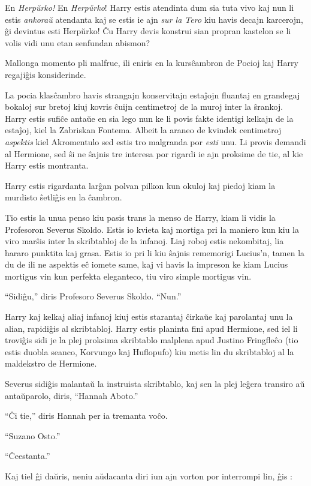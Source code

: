 En \emph{Herpŭrko!} En \emph{Herpŭrko}! Harry estis atendinta dum sia
tuta vivo kaj nun li estis \emph{ankoraŭ} atendanta kaj se estis ie
ajn \emph{sur la Tero} kiu havis decajn karcerojn, ĝi devintus esti
Herpŭrko! Ĉu Harry devis konstrui sian propran kastelon se li volis
vidi unu etan senfundan abismon?

Mallonga momento pli malfrue, ili eniris en la kursĉambron de Pocioj
kaj Harry regajiĝis konsiderinde.

La pocia klasĉambro havis strangajn konservitajn estaĵojn fluantaj en
grandegaj bokaloj sur bretoj kiuj kovris ĉuijn centimetroj de la muroj
inter la ŝrankoj. Harry estis sufiĉe antaŭe en sia lego nun ke li
povis fakte identigi kelkajn de la estaĵoj, kiel la Zabriskan
Fontema. Albeit la araneo de kvindek centimetroj \emph{aspektis} kiel
Akromentulo sed estis tro malgranda por \emph{esti} unu. Li provis
demandi al Hermione, sed ŝi ne ŝajnis tre interesa por rigardi ie ajn
proksime de tie, al kie Harry estis montranta.

Harry estis rigardanta larĝan polvan pilkon kun okuloj kaj piedoj kiam
la murdisto ŝetliĝis en la ĉambron.

Tio estis la unua penso kiu pasis trans la menso de Harry, kiam li
vidis la Profesoron Severus Skoldo. Estis io kvieta kaj mortiga pri la
maniero kun kiu la viro marŝis inter la skribtabloj de la
infanoj. Liaj roboj estis nekombitaj, lia hararo punktita kaj
grasa. Estis io pri li kiu ŝajnis rememorigi Lucius'n, tamen la du de
ili ne aspektis eĉ iomete same, kaj vi havis la impreson ke kiam
Lucius mortigus vin kun perfekta eleganteco, tiu viro simple mortigus
vin.

``Sidiĝu,'' diris Profesoro Severus Skoldo. ``Nun.''

Harry kaj kelkaj aliaj infanoj kiuj estis starantaj ĉirkaŭe kaj
parolantaj unu la alian, rapidiĝis al skribtabloj. Harry estis
planinta fini apud Hermione, sed iel li troviĝis sidi je la plej
proksima skribtablo malplena apud Justino Fringfleĉo (tio estis duobla
seanco, Korvungo kaj Huflopufo) kiu metis lin du skribtabloj al la
maldekstro de Hermione.

Severus sidiĝis malantaŭ la instruista skribtablo, kaj sen la plej
leĝera transiro aŭ antaŭparolo, diris, ``Hannah Aboto.''

``Ĉi tie,'' diris Hannah per ia tremanta voĉo.

``Suzano Osto.''

``Ĉeestanta.''

Kaj tiel ĝi daŭris, neniu aŭdacanta diri iun ajn vorton por interrompi lin, ĝis :

